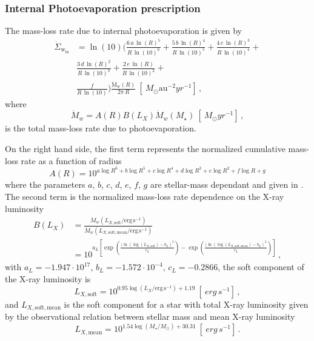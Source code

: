 \documentclass[fleqn,usenatbib]{mnras}
\begin{document}
\subsubsection{Internal Photoevaporation prescription}
The mass-loss rate due to internal photoevaporation is given by \citep{2021MNRAS.508.3611P}
\begin{eqnarray}
  \label{eq:surf1}
  \dot{\Sigma}_{\mathrm{w_{in}}} &= \ln{(10)} \bigg(\frac{6\, a\, \ln{(R)}^5}{R\, \ln{(10)}^6} +
  \frac{5\, b\, \ln{(R)}^4}{R\, \ln{(10)}^5} +
  \frac{4\, c\, \ln{(R)}^3}{R\, \ln{(10)}^4} + \\ \nonumber
  &\frac{3\, d\, \ln{(R)}^2}{R\, \ln{(10)}^3} +
  \frac{2\, e\, \ln{(R)}}{R\, \ln{(10)}^2} + \\ \nonumber
  &\frac{f}{R\, \ln{(10)}}\bigg)
  \frac{\dot{\mathrm{M}}_w(R)}{2\pi\, R} \ [\SI{}{M_\odot \textrm{au}^{-2} yr^{-1}}]\,,
\end{eqnarray}
where
\begin{equation}\label{eq:mdot}
    \dot{M}_{w} = A(R) B(L_X) \dot{M}_w(M_\star) \ [\SI{}{M_\odot yr^{-1}}]\,,
\end{equation}
is the total mass-loss rate due to photoevaporation.

On the right hand side, the first term represents the normalized cumulative mass-loss rate as a function of radius \citep{2021MNRAS.508.3611P}
\begin{equation}
\label{eq:surf2}
  A(R) = 10^{a\log{R}^6 + b\log{R}^5 + c\log{R}^4 + d\log{R}^3 + e\log{R}^2 + f\log{R} + g}
\end{equation}
where the parameters $a$, $b$, $c$, $d$, $e$, $f$, $g$ are stellar-mass dependant and given in \citet[][Table 2]{2021MNRAS.508.3611P}.
The second term is the normalized mass-loss rate dependence on the X-ray luminosity \citep{2021MNRAS.508.1675E}
\begin{equation}\label{eq:mdotlx}
    \begin{split}
    B(L_X) &= \frac{\dot{M}_w(L_{X,\mathrm{soft}} / \mathrm{erg} \,\mathrm{s}^{-1})}{\dot{M}_w(L_{X,\mathrm{soft, mean}}/ \mathrm{erg} \,\mathrm{s}^{-1})} \\
    &= 10^{a_L \left[\exp{\left(\frac{(\ln(\log(L_{X,\mathrm{soft}})-b_L)^2}{c_L}\right)} -\exp{\left(\frac{(\ln(\log(L_{X,\mathrm{soft, mean}})-b_L)^2}{c_L}\right)}\right]} \,,
    \end{split}
\end{equation}
with $a_L = -1.947\cdot 10^{17}$, $b_L = -1.572\cdot 10^{-4}$, $c_L = -0.2866$, the soft component of the X-ray luminosity is
\begin{equation}\label{eq:lxsoft}
    L_{X,\mathrm{soft}} = 10^{0.95 \log{(L_X / \mathrm{erg} \,\mathrm{s}^{-1})}+1.19} \ [\SI{}{erg \, s^{-1}}]\,,
\end{equation}
and $L_{X,\mathrm{soft, mean}}$ is the soft component for a star with total X-ray luminosity given by the observational relation between stellar mass and mean X-ray luminosity \citep{2007A&A...468..353G}
\begin{equation} \label{eq:LxMstar}
    L_{X, \mathrm{mean}} = 10^{1.54 \log(M_\star / M_\odot) + 30.31} \ [\SI{}{erg \, s^{-1}}]\,.
\end{equation}
\end{document}
